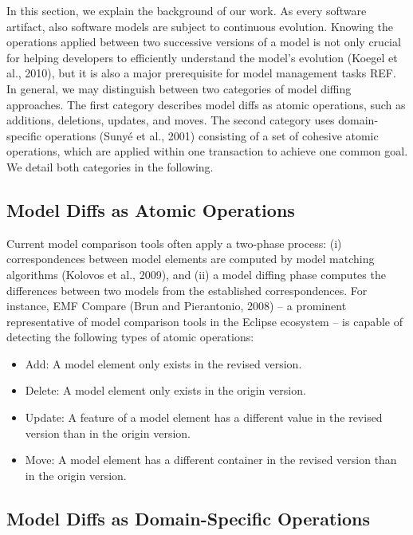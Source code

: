 In this section, we explain the background of our work. As every software artifact, also software models are subject to continuous evolution. Knowing the operations applied between two successive versions of a model is not only crucial for helping developers to efficiently understand the model's evolution (Koegel et al., 2010), but it is also a major prerequisite for model management tasks REF. In general, we may distinguish between two categories of model diffing approaches. The first category describes model diffs as atomic operations, such as additions, deletions, updates, and moves. The second category uses domain-specific operations (Sunyé et al., 2001) consisting of a set of cohesive atomic operations, which are applied within one transaction to achieve one common goal. We detail both categories in the following.

\subsection{Model Diffs as Atomic Operations}

Current model comparison tools often apply a two-phase process: (i) correspondences between model elements are computed by model matching algorithms (Kolovos et al., 2009), and (ii) a model diffing phase computes the differences between two models from the established correspondences. For instance, EMF Compare (Brun and Pierantonio, 2008) – a prominent representative of model comparison tools in the Eclipse ecosystem – is capable of detecting the following types of atomic operations:

\begin{itemize}
  \item Add: A model element only exists in the revised version.
  \item Delete: A model element only exists in the origin version.
  \item Update: A feature of a model element has a different value in the revised version than in the origin version.
  \item Move: A model element has a different container in the revised version than in the origin version.
\end{itemize}


\subsection{Model Diffs as Domain-Specific Operations}

